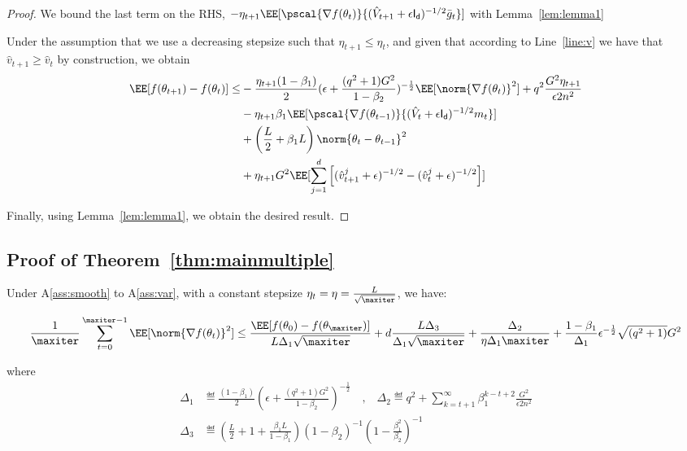 \documentclass[11pt]{article}
\begin{document}
\begin{proof}
We bound the last term on the RHS, $ -\eta_{t+1} \EE[\pscal{\nabla f(\theta_t)}{(\hat{V}_{t+1} + \epsilon \mathsf{I_d})^{-1/2} \bar{g}_t}]$ with Lemma~\ref{lem:lemma1}

Under the assumption that we use a decreasing stepsize such that $\eta_{t+1} \leq \eta_{t}$, and given that according to Line~\ref{line:v} we have that $\hat v_{t+1} \geq \hat v_{t}$ by construction, we obtain 
\begin{equation}
\begin{split}
\EE[f(\theta_{t+1}) - f(\theta_{t}) ] \leq &   - \frac{\eta_{t+1}(1-\beta_1)}{2}  (\epsilon + \frac{(q^2+1)G^2}{1 - \beta_2})^{-\frac{1}{2}} \EE[\norm{\nabla f(\theta_t)}^2] +q^2 \frac{G^2 \eta_{t+1}}{\epsilon 2n^2} \\
&- \eta_{t+1} \beta_1\EE[\pscal{\nabla f(\theta_{t-1})}{(\hat{V}_{t} + \epsilon \mathsf{I_d})^{-1/2} m_{t}}]\\
& +  \left(\frac{L}{2} + \beta_1 L \right) \norm{\theta_t - \theta_{t-1}}^2\\
&+   \eta_{t+1} G^2 \EE[\sum_{j=1}^d \left[(\hat{v}^j_{t+1} + \epsilon )^{-1/2} - (\hat{v}^j_{t} + \epsilon )^{-1/2}  \right] ]
\end{split}
\end{equation}

Finally, using Lemma~\ref{lem:lemma1}, we obtain the desired result.
\end{proof}



\subsection{Proof of Theorem~\ref{thm:mainmultiple}}


\begin{Theorem*}
Under A\ref{ass:smooth} to A\ref{ass:var}, with a constant stepsize $\eta_t = \eta = \frac{L}{\sqrt{\maxiter}}$, we have:

\begin{equation}
\begin{split}
 \frac{1}{\maxiter}\sum_{t=0}^{\maxiter -1} \EE[\norm{\nabla f(\theta_t)}^2] \leq \frac{\EE[ f(\theta_{0}) - f(\theta_{\maxiter})]}{L \Delta_1 \sqrt{\maxiter}} + 
d\frac{L \Delta_3}{\Delta_1 \sqrt{\maxiter}}  + \frac{\Delta_2}{\eta \Delta_1\maxiter} +\frac{1-\beta_1}{\Delta_1}  \epsilon^{-\frac{1}{2}} \sqrt{(q^2+1)}G^2 
\end{split}
\end{equation}

where 
\begin{equation}
\begin{split}
\Delta_1 & \eqdef \frac{(1-\beta_1)}{2} (\epsilon + \frac{(q^2+1)G^2}{1 - \beta_2})^{-\frac{1}{2}} \quad \textrm{,} \quad \Delta_2 \eqdef q^2 + \sum_{k=t+1}^\infty  \beta_1^{k-t+2}\frac{G^2 }{\epsilon 2n^2}\\
\Delta_3 &\eqdef \left(\frac{L}{2} + 1+ \frac{\beta_1L}{1-\beta_1} \right) (1-\beta_2)^{-1} (1 - \frac{\beta_1^{2}}{\beta_2})^{-1}
\end{split}
\end{equation}
\end{Theorem*}
\end{document}
